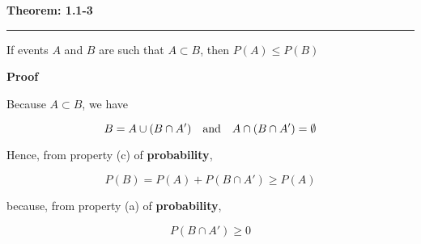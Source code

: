 \nopagenumbers
{\bf Theorem: 1.1-3}
\vskip 1mm
\hrule

\vskip 6pt
If events $A$ and $B$ are such that $A\subset B$, then $P(A)\leq P(B)$

\vskip 10pt
{\bf Proof}

\vskip 6pt
Because $A\subset B$, we have

$$B=A\cup (B\cap A')\quad\hbox{and}\quad A\cap(B\cap A')=\emptyset$$

Hence, from property (c) of {\bf probability},

$$P(B)=P(A)+P(B\cap A')\geq P(A)$$

because, from property (a) of {\bf probability},

$$P(B\cap A')\geq 0$$


\vfill\eject
\bye
